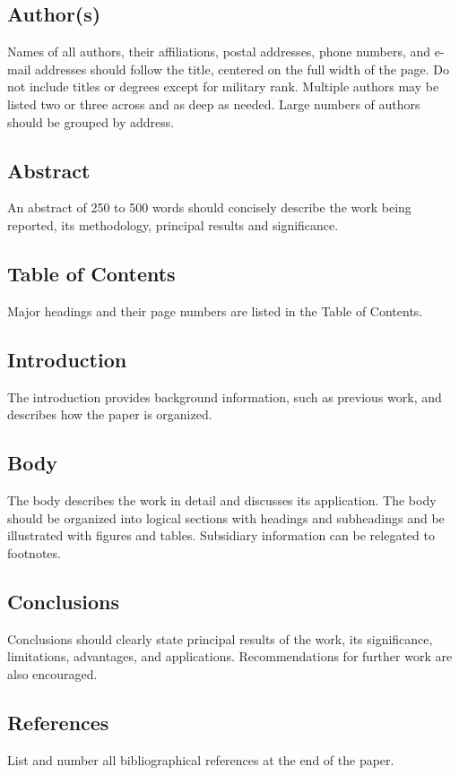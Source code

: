 \documentclass[twocolumn,letterpaper]{IEEEAerospaceCLS}  %
\begin{document}
\subsection{Author(s)}
Names of all authors, their affiliations, postal addresses, phone numbers, and e-mail addresses should follow the title, centered on the full width of the page. Do not include titles or degrees except for military rank. Multiple authors may be listed two or three across and as deep as needed. Large numbers of authors should be grouped by address.

\subsection{Abstract}
An abstract of 250 to 500 words should concisely describe the work being reported, its methodology, principal results and significance.

\subsection{Table of Contents}
Major headings and their page numbers are listed in the Table of Contents.

\subsection{Introduction}
The introduction provides background information, such as previous work, and describes how the paper is organized.

\subsection{Body}
The body describes the work in detail and discusses its application. The body should be organized into logical sections with headings and subheadings and be illustrated with figures and tables. Subsidiary information can be relegated to footnotes.

\subsection{Conclusions}
Conclusions should clearly state principal results of the work, its significance, limitations, advantages, and applications. Recommendations for further work are also encouraged.

\subsection{References}
List and number all bibliographical references at the end of the paper.
\end{document}
